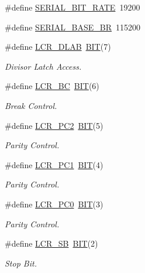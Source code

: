 \begin{DoxyCompactItemize}
\#define \hyperlink{group___serial_ga16e7001a19bba69533659ff82cbead08}{S\+E\+R\+I\+A\+L\+\_\+\+B\+I\+T\+\_\+\+R\+A\+TE}~19200
\item 
\#define \hyperlink{group___serial_ga5a02cec014399767cbb673100ccfa3f8}{S\+E\+R\+I\+A\+L\+\_\+\+B\+A\+S\+E\+\_\+\+BR}~115200
\item 
\#define \hyperlink{group___serial_ga1cf80a668c79b3081803063178f40920}{L\+C\+R\+\_\+\+D\+L\+AB}~\hyperlink{group___serial_ga3a8ea58898cb58fc96013383d39f482c}{B\+IT}(7)
\begin{DoxyCompactList}\small\item\em Divisor Latch Access. \end{DoxyCompactList}\item 
\#define \hyperlink{group___serial_ga896faa6ed28b750f3a5b9927ea12aedb}{L\+C\+R\+\_\+\+BC}~\hyperlink{group___serial_ga3a8ea58898cb58fc96013383d39f482c}{B\+IT}(6)
\begin{DoxyCompactList}\small\item\em Break Control. \end{DoxyCompactList}\item 
\#define \hyperlink{group___serial_ga5e6060e38b2ad74954b34f6ac82b8a5b}{L\+C\+R\+\_\+\+P\+C2}~\hyperlink{group___serial_ga3a8ea58898cb58fc96013383d39f482c}{B\+IT}(5)
\begin{DoxyCompactList}\small\item\em Parity Control. \end{DoxyCompactList}\item 
\#define \hyperlink{group___serial_ga6ab1327cf213d22d2acc07b397c85f0f}{L\+C\+R\+\_\+\+P\+C1}~\hyperlink{group___serial_ga3a8ea58898cb58fc96013383d39f482c}{B\+IT}(4)
\begin{DoxyCompactList}\small\item\em Parity Control. \end{DoxyCompactList}\item 
\#define \hyperlink{group___serial_ga5b25ad27007f83425b63a30298743f01}{L\+C\+R\+\_\+\+P\+C0}~\hyperlink{group___serial_ga3a8ea58898cb58fc96013383d39f482c}{B\+IT}(3)
\begin{DoxyCompactList}\small\item\em Parity Control. \end{DoxyCompactList}\item 
\#define \hyperlink{group___serial_ga9d59a56595a0f0c5af42cab8a9d3a656}{L\+C\+R\+\_\+\+SB}~\hyperlink{group___serial_ga3a8ea58898cb58fc96013383d39f482c}{B\+IT}(2)
\begin{DoxyCompactList}\small\item\em Stop Bit. \end{DoxyCompactList}\item 

\end{DoxyCompactItemize}
